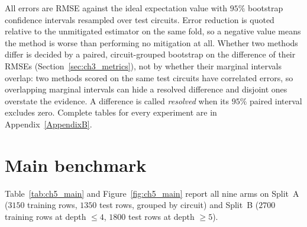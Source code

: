\documentclass[Thesis.tex]{subfiles}
\begin{document}
All errors are RMSE against the ideal expectation value with $95\%$ bootstrap
confidence intervals resampled over test circuits. Error reduction is quoted
relative to the unmitigated estimator on the same fold, so a negative value means
the method is worse than performing no mitigation at all. Whether two methods differ
is decided by a paired, circuit-grouped bootstrap on the difference of their RMSEs
(Section~\ref{sec:ch3_metrics}), not by whether their marginal intervals overlap: two
methods scored on the same test circuits have correlated errors, so overlapping
marginal intervals can hide a resolved difference and disjoint ones overstate the
evidence. A difference is called \emph{resolved} when its $95\%$ paired interval
excludes zero. Complete tables for every experiment are in Appendix~\ref{AppendixB}.

\section{Main benchmark}\label{sec:ch5_main}

Table~\ref{tab:ch5_main} and Figure~\ref{fig:ch5_main} report all nine arms on
Split~A ($3150$ training rows, $1350$ test rows, grouped by circuit) and Split~B
($2700$ training rows at depth $\leq 4$, $1800$ test rows at depth $\geq 5$).
\end{document}
